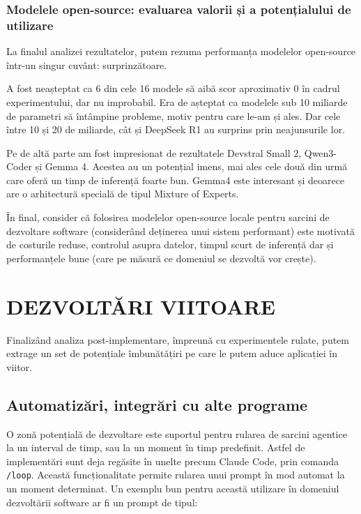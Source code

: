 \documentclass[12pt, a4paper, oneside, romanian]{teza-upb}
\begin{document}
  \subsection{Modelele open-source: evaluarea valorii și a potențialului de utilizare}

  La finalul analizei rezultatelor, putem rezuma performanța modelelor open-source într-un singur cuvânt: surprinzătoare.
   
  A fost neașteptat ca 6 din cele 16 modele să aibă scor aproximativ 0 în cadrul experimentului, dar nu improbabil. Era de așteptat ca modelele sub 10 miliarde de parametri să întâmpine probleme, motiv
  pentru care le-am și ales. Dar cele între 10 și 20 de miliarde, cât și DeepSeek R1 au surprins prin neajunsurile lor.

  Pe de altă parte am fost impresionat de rezultatele Devstral Small 2, Qwen3-Coder și Gemma 4. Acestea au un potențial imens, mai ales cele două din urmă care oferă un timp de inferență foarte bun. Gemma4 este interesant și deoarece are o arhitectură specială de tipul Mixture of Experts.

  În final, consider că folosirea modelelor open-source locale pentru sarcini de dezvoltare software (considerând deținerea unui sistem performant) este motivată de costurile reduse, controlul asupra datelor, timpul scurt de inferență dar și performanțele bune (care pe măsură ce domeniul se dezvoltă vor crește).

\chapter{DEZVOLTĂRI VIITOARE}

  Finalizând analiza post-implementare, împreună cu experimentele rulate, putem extrage un set de potențiale
  îmbunătățiri pe care le putem aduce aplicației în viitor.

  \section{Automatizări, integrări cu alte programe}

  O zonă potențială de dezvoltare este suportul pentru rularea de sarcini agentice la un interval de timp, sau la un moment în timp predefinit. Astfel de implementări sunt deja regăsite
  în unelte precum Claude Code, prin comanda \texttt{/loop}. Această funcționalitate permite rularea unui prompt în mod automat la un moment determinat. Un exemplu bun pentru această utilizare în domeniul
  dezvoltării software ar fi un prompt de tipul:
\end{document}
